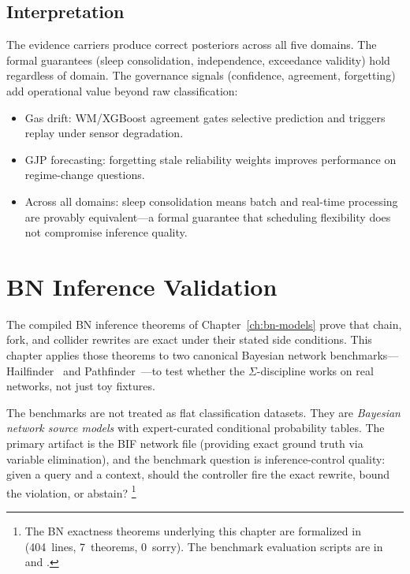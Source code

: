 \documentclass[11pt,openany]{report}
\begin{document}
\section{Interpretation}

The evidence carriers produce correct posteriors across all five
domains.  The formal guarantees (sleep consolidation,
independence, exceedance validity) hold regardless of domain.
The governance signals (confidence, agreement, forgetting) add
operational value beyond raw classification:
\begin{itemize}
\item Gas drift: WM/XGBoost agreement gates selective prediction
  and triggers replay under sensor degradation.
\item GJP forecasting: forgetting stale reliability weights
  improves performance on regime-change questions.
\item Across all domains: sleep consolidation means batch and
  real-time processing are provably equivalent---a formal
  guarantee that scheduling flexibility does not compromise
  inference quality.
\end{itemize}


\chapter{BN Inference Validation}
\label{ch:bn-validation}

The compiled BN inference theorems of
Chapter~\ref{ch:bn-models} prove that chain, fork, and collider
rewrites are exact under their stated side conditions.  This
chapter applies those theorems to two canonical Bayesian network
benchmarks---Hailfinder~\cite{Abramson1996Hailfinder} and
Pathfinder~\cite{Heckerman1992Pathfinder}---to test whether the
$\Sigma$-discipline works on real networks, not just toy fixtures.

The benchmarks are not treated as flat classification datasets.
They are \emph{Bayesian network source models} with expert-curated
conditional probability tables.  The primary artifact is the BIF
network file (providing exact ground truth via variable
elimination), and the benchmark question is inference-control
quality: given a query and a context, should the controller fire
the exact rewrite, bound the violation, or abstain?%
\footnote{The BN exactness theorems underlying this chapter are
formalized in
(404~lines, 7~theorems, 0~sorry).  The benchmark evaluation
scripts are in
 and
.}
\end{document}
